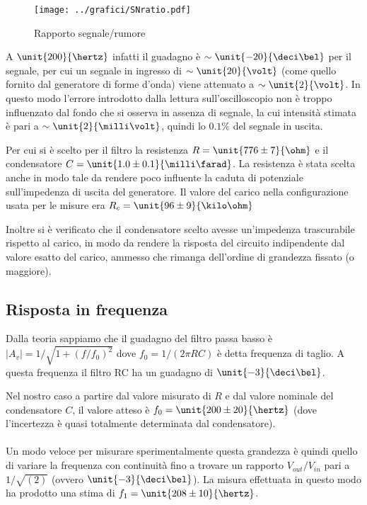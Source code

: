\documentclass[10pt,a4paper]{article}
\begin{document}
\begin{figure}[h!]
	\centering
	\texttt{[image: ../grafici/SNratio.pdf]}
	\caption{Rapporto segnale/rumore}
\end{figure}

A $\unit{200}{\hertz}$ infatti il guadagno è $\sim \unit{-20}{\deci\bel}$ per il segnale, per cui un segnale in ingresso di $\sim \unit{20}{\volt}$ (come quello fornito dal generatore di forme d'onda) viene attenuato a $\sim \unit{2}{\volt}$. In questo modo l'errore introdotto dalla lettura sull'oscilloscopio non è troppo influenzato dal fondo che si osserva in assenza di segnale, la cui intensità stimata è pari a $\sim \unit{2}{\milli\volt}$, quindi lo $0.1\%$ del segnale in uscita.

Per cui si è scelto per il filtro la resistenza $R = \unit{776 \pm 7}{\ohm}$ e il condensatore $C = \unit{1.0 \pm 0.1}{\milli\farad}$. La resistenza è stata scelta anche in modo tale da rendere poco influente la caduta di potenziale sull'impedenza di uscita del generatore. Il valore del carico nella configurazione usata per le misure era $R_{c} = \unit{96 \pm 9}{\kilo\ohm}$

Inoltre si è verificato che il condensatore scelto avesse un'impedenza trascurabile rispetto al carico, in modo da rendere la risposta del circuito indipendente dal valore esatto del carico, ammesso che rimanga dell'ordine di grandezza fissato (o maggiore).

\subsection{Risposta in frequenza}
Dalla teoria sappiamo che il guadagno del filtro passa basso è $|A_v|=1/\sqrt{1+(f/f_0)^2}$ dove $f_0 = 1/(2 \pi RC)$ è detta frequenza di taglio. A questa frequenza il filtro RC ha un guadagno di $\unit{-3}{\deci\bel}$.

Nel nostro caso a partire dal valore misurato di $R$ e dal valore nominale del condensatore $C$, il valore atteso è $f_0 = \unit{200 \pm 20}{\hertz}$ (dove l'incertezza è quasi totalmente determinata dal condensatore).

\paragraph{} Un modo veloce per misurare sperimentalmente questa grandezza è quindi quello di variare la frequenza con continuità fino a trovare  un rapporto $V_{out}/V_{in}$ pari a $1/\sqrt{(2)}$ (ovvero $\unit{-3}{\deci\bel}$). La misura effettuata in questo modo ha prodotto una stima di $f_1 =\unit{208 \pm 10}{\hertz}$.
\end{document}
